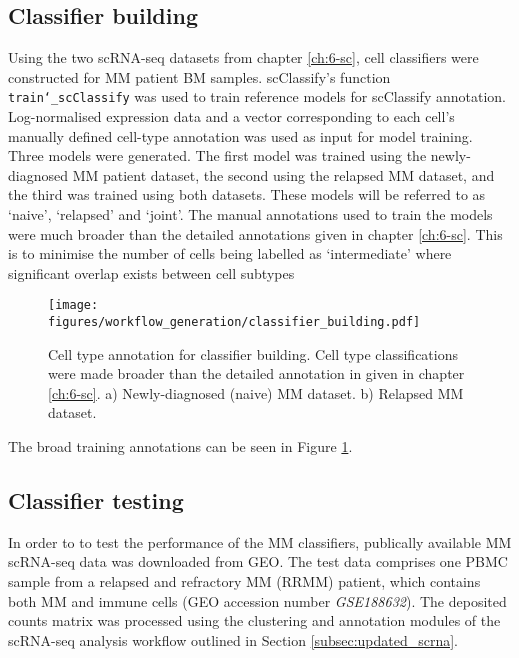 \subsection{Classifier building}\label{subsec:MM_classifier_model_building}
Using the two scRNA-seq datasets from chapter \ref{ch:6-sc}, cell classifiers were constructed for MM patient BM samples.
scClassify's function \texttt{train\char`_scClassify} was used to train reference models for scClassify annotation.
Log-normalised expression data and a vector corresponding to each cell's manually defined cell-type annotation was used as input for model training.
Three models were generated.
The first model was trained using the newly-diagnosed MM patient dataset, the second using the relapsed MM dataset, and the third was trained using  both datasets.
These models will be referred to as `naive', `relapsed' and `joint'.
The manual annotations used to train the models were much broader than the detailed annotations given in chapter \ref{ch:6-sc}.
This is to minimise the number of cells being labelled as `intermediate' where significant overlap exists between cell subtypes
%
\begin{figure}[htb]
\centering
\texttt{[image: figures/workflow\_generation/classifier\_building.pdf]}
\caption[Classifier annotation building]{Cell type annotation for classifier building.
Cell type classifications were made broader than the detailed annotation in given in chapter \ref{ch:6-sc}.
a) Newly-diagnosed (naive) MM dataset.
b) Relapsed MM dataset.}
\label{fig:classifier_building}
\end{figure}
%
The broad training annotations can be seen in Figure \ref{fig:classifier_building}.

\subsection{Classifier testing}
In order to to test the performance of the MM classifiers, publically available MM scRNA-seq data was downloaded from GEO\@.
The test data comprises one PBMC sample from a relapsed and refractory MM (RRMM) patient, which contains both MM and immune cells (GEO accession number \textit{GSE188632}).
The deposited counts matrix was processed using the clustering and annotation modules of the scRNA-seq analysis workflow outlined in Section \ref{subsec:updated_scrna}.

